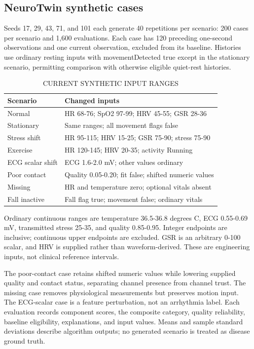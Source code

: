\documentclass[journal]{IEEEtran}
\begin{document}
\subsection{NeuroTwin synthetic cases}
Seeds 17, 29, 43, 71, and 101 each generate 40 repetitions per scenario: 200 cases per scenario and 1,600 evaluations. Each case has 120 preceding one-second observations and one current observation, excluded from its baseline. Histories use ordinary resting inputs with movementDetected true except in the stationary scenario, permitting comparison with otherwise eligible quiet-rest histories.

\begin{table}[!t]\caption{CURRENT SYNTHETIC INPUT RANGES}\centering\scriptsize\setlength{\tabcolsep}{2pt}
\begin{tabular}{p{}p{}}\hline
Scenario & Changed inputs\\\hline
Normal & HR 68-76; SpO2 97-99; HRV 45-55; GSR 28-36\\
Stationary & Same ranges; all movement flags false\\
Stress shift & HR 95-115; HRV 15-25; GSR 75-90; stress 75-90\\
Exercise & HR 120-145; HRV 20-35; activity Running\\
ECG scalar shift & ECG 1.6-2.0 mV; other values ordinary\\
Poor contact & Quality 0.05-0.20; fit false; shifted numeric values\\
Missing & HR and temperature zero; optional vitals absent\\
Fall inactive & Fall flag true; movement false; ordinary vitals\\
\hline\end{tabular}\end{table}
Ordinary continuous ranges are temperature 36.5-36.8 degrees C, ECG 0.55-0.69 mV, transmitted stress 25-35, and quality 0.85-0.95. Integer endpoints are inclusive; continuous upper endpoints are excluded. GSR is an arbitrary 0-100 scalar, and HRV is supplied rather than waveform-derived. These are engineering inputs, not clinical reference intervals.

The poor-contact case retains shifted numeric values while lowering supplied quality and contact status, separating channel presence from channel trust. The missing case removes physiological measurements but preserves motion input. The ECG-scalar case is a feature perturbation, not an arrhythmia label. Each evaluation records component scores, the composite category, quality reliability, baseline eligibility, explanations, and input values. Means and sample standard deviations describe algorithm outputs; no generated scenario is treated as disease ground truth.
\end{document}
